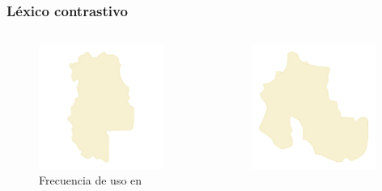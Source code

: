 \begin{frame}[t]\frametitle{Léxico contrastivo}
     
     \begin{columns}[t]  
        \begin{column}{.48\textwidth}
            \begin{figure}
                \includegraphics[width=0.95\textwidth]{../src/images/presentacion/mendoza.png}
                \caption{Frecuencia de uso en }
                \label{fig:mendoza}
            \end{figure}
        \end{column}
        \begin{column}{.48\textwidth}   
            \begin{figure}
                \includegraphics[width=0.95\textwidth]{../src/images/presentacion/jujuy.png}

\end{figure}
\end{column}
\end{columns}
\end{frame}
